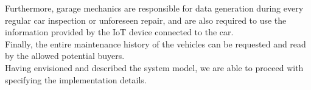 \newline
Furthermore, garage mechanics are responsible for data generation during every regular car inspection or unforeseen repair, and are also required to use the information provided by the IoT device connected to the car.\\
\newline
Finally, the entire maintenance history of the vehicles can be requested and read by the allowed potential buyers.\\
\newline
Having envisioned and described the system model, we are able to proceed with specifying the implementation details.


